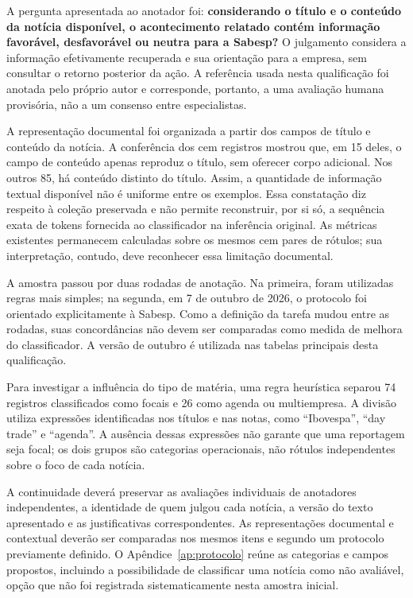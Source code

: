 A pergunta apresentada ao anotador foi: \textbf{considerando o título e o conteúdo da notícia disponível, o acontecimento relatado contém informação favorável, desfavorável ou neutra para a Sabesp?} O julgamento considera a informação efetivamente recuperada e sua orientação para a empresa, sem consultar o retorno posterior da ação. A referência usada nesta qualificação foi anotada pelo próprio autor e corresponde, portanto, a uma avaliação humana provisória, não a um consenso entre especialistas.

A representação documental foi organizada a partir dos campos de título e conteúdo da notícia. A conferência dos cem registros mostrou que, em 15 deles, o campo de conteúdo apenas reproduz o título, sem oferecer corpo adicional. Nos outros 85, há conteúdo distinto do título. Assim, a quantidade de informação textual disponível não é uniforme entre os exemplos. Essa constatação diz respeito à coleção preservada e não permite reconstruir, por si só, a sequência exata de tokens fornecida ao classificador na inferência original. As métricas existentes permanecem calculadas sobre os mesmos cem pares de rótulos; sua interpretação, contudo, deve reconhecer essa limitação documental.

A amostra passou por duas rodadas de anotação. Na primeira, foram utilizadas regras mais simples; na segunda, em 7 de outubro de 2026, o protocolo foi orientado explicitamente à Sabesp. Como a definição da tarefa mudou entre as rodadas, suas concordâncias não devem ser comparadas como medida de melhora do classificador. A versão de outubro é utilizada nas tabelas principais desta qualificação.

Para investigar a influência do tipo de matéria, uma regra heurística separou 74 registros classificados como focais e 26 como agenda ou multiempresa. A divisão utiliza expressões identificadas nos títulos e nas notas, como ``Ibovespa'', ``day trade'' e ``agenda''. A ausência dessas expressões não garante que uma reportagem seja focal; os dois grupos são categorias operacionais, não rótulos independentes sobre o foco de cada notícia.

A continuidade deverá preservar as avaliações individuais de anotadores independentes, a identidade de quem julgou cada notícia, a versão do texto apresentado e as justificativas correspondentes. As representações documental e contextual deverão ser comparadas nos mesmos itens e segundo um protocolo previamente definido. O Apêndice~\ref{ap:protocolo} reúne as categorias e campos propostos, incluindo a possibilidade de classificar uma notícia como não avaliável, opção que não foi registrada sistematicamente nesta amostra inicial.

